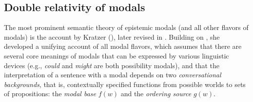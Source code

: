 









\subsection{Double relativity of modals}

The most prominent semantic theory of epistemic modals (and all other flavors of modals) is the account by Kratzer 
(\citeyear{Kratzer1981,Kratzer1991}), later revised in \textcite{Kratzer2012}. Building on \textcite{Lewis1973}, she developed a unifying 
account of all modal flavors, which assumes that there are several core meanings of modals that can be expressed 
by various linguistic devices (e.g., \textit{could} and \textit{might} are both possibility modals), and that the interpretation
of a sentence with a modal depends on two \textit{conversational backgrounds}, that is, contextually specified functions 
from possible worlds to sets of propositions: 
the \textit{modal base} $f(w)$ and the \textit{ordering source} $g(w)$. 

